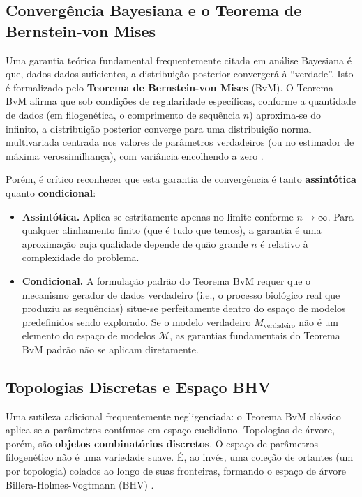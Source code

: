 \subsection{Convergência Bayesiana e o Teorema de Bernstein-von Mises}

Uma garantia teórica fundamental frequentemente citada em análise Bayesiana é que, dados dados suficientes, a distribuição posterior convergerá à ``verdade''. Isto é formalizado pelo \textbf{Teorema de Bernstein-von Mises} (BvM). O Teorema BvM afirma que sob condições de regularidade específicas, conforme a quantidade de dados (em filogenética, o comprimento de sequência $n$) aproxima-se do infinito, a distribuição posterior converge para uma distribuição normal multivariada centrada nos valores de parâmetros verdadeiros (ou no estimador de máxima verossimilhança), com variância encolhendo a zero \parencite{vandervaart1998}.

Porém, é crítico reconhecer que esta garantia de convergência é tanto \textbf{assintótica} quanto \textbf{condicional}:

\begin{itemize}
    \item \textbf{Assintótica.} Aplica-se estritamente apenas no limite conforme $n \to \infty$. Para qualquer alinhamento finito (que é tudo que temos), a garantia é uma aproximação cuja qualidade depende de quão grande $n$ é relativo à complexidade do problema.
    \item \textbf{Condicional.} A formulação padrão do Teorema BvM requer que o mecanismo gerador de dados verdadeiro (i.e., o processo biológico real que produziu as sequências) situe-se perfeitamente dentro do espaço de modelos predefinidos sendo explorado. Se o modelo verdadeiro $M_{\text{verdadeiro}}$ não é um elemento do espaço de modelos $\mathcal{M}$, as garantias fundamentais do Teorema BvM padrão não se aplicam diretamente.
\end{itemize}

\subsection{Topologias Discretas e Espaço BHV}

Uma sutileza adicional frequentemente negligenciada: o Teorema BvM clássico aplica-se a parâmetros contínuos em espaço euclidiano. Topologias de árvore, porém, são \textbf{objetos combinatórios discretos}. O espaço de parâmetros filogenético não é uma variedade suave. É, ao invés, uma coleção de ortantes (um por topologia) colados ao longo de suas fronteiras, formando o espaço de árvore Billera-Holmes-Vogtmann (BHV) \parencite{billera2001}.

